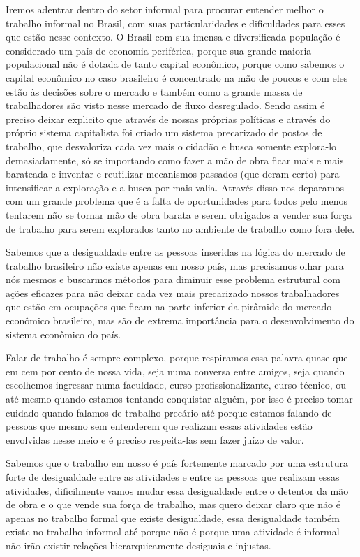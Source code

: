 Iremos adentrar dentro do setor informal para procurar entender melhor o trabalho informal no Brasil, com suas
particularidades e dificuldades para esses que estão nesse contexto. O Brasil com sua imensa e diversificada
população é considerado um país de economia periférica, porque sua grande maioria populacional não é dotada de 
tanto capital econômico, porque como sabemos o capital econômico no caso brasileiro é concentrado na mão de 
poucos e com eles estão às decisões sobre o mercado e também como a grande massa de trabalhadores são visto 
nesse mercado de fluxo desregulado. Sendo assim é preciso deixar explicito que através de nossas próprias 
políticas e através do próprio sistema capitalista foi criado um sistema precarizado de postos de trabalho, 
que desvaloriza cada vez mais o cidadão e busca somente explora-lo demasiadamente, só se importando como fazer 
a mão de obra ficar mais e mais barateada e inventar e reutilizar mecanismos passados (que deram certo) para 
intensificar a exploração e a busca por mais-valia. Através disso nos deparamos com um grande problema que é 
a falta de oportunidades para todos pelo menos tentarem não se tornar mão de obra barata e serem obrigados a 
vender sua força de trabalho para serem explorados tanto no ambiente de trabalho como fora dele.

Sabemos que a desigualdade entre as pessoas inseridas na lógica do mercado de trabalho brasileiro não existe 
apenas em nosso país, mas precisamos olhar para nós mesmos e buscarmos métodos para diminuir esse problema 
estrutural com ações eficazes para não deixar cada vez mais precarizado nossos trabalhadores que estão em 
ocupações que ficam na parte inferior da pirâmide do mercado econômico brasileiro, mas são de extrema 
importância para o desenvolvimento do sistema econômico do país. 

Falar de trabalho é sempre complexo, porque respiramos essa palavra quase que em cem por cento de nossa vida, 
seja numa conversa entre amigos, seja quando escolhemos ingressar numa faculdade, curso profissionalizante, 
curso técnico, ou até mesmo quando estamos tentando conquistar alguém, por isso é preciso tomar cuidado quando 
falamos de trabalho precário até porque estamos falando de pessoas que mesmo sem entenderem que realizam essas 
atividades estão envolvidas nesse meio e é preciso respeita-las sem fazer juízo de valor.

Sabemos que o trabalho em nosso é país fortemente marcado por uma estrutura forte de desigualdade entre as 
atividades e entre as pessoas que realizam essas atividades, dificilmente vamos mudar essa desigualdade entre 
o detentor da mão de obra e o que vende sua força de trabalho, mas quero deixar claro que não é apenas no 
trabalho formal que existe desigualdade, essa desigualdade também existe no trabalho informal até porque não 
é porque uma atividade é informal não irão existir relações hierarquicamente desiguais e injustas.

